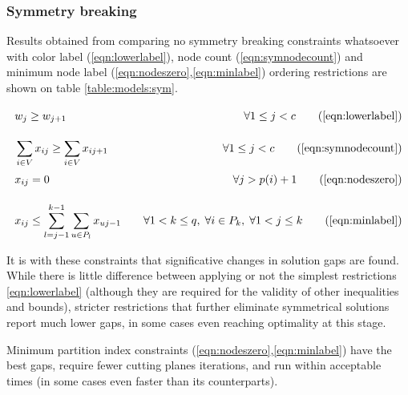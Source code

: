 \subsubsection*{Symmetry breaking}

Results obtained from comparing no symmetry breaking constraints whatsoever with color label (\ref{eqn:lowerlabel}), node count (\ref{eqn:symnodecount}) and minimum node label (\ref{eqn:nodeszero},\ref{eqn:minlabel}) ordering restrictions are shown on table \ref{table:models:sym}.

\begin{align*}
& w_j \geq w_{j+1} \sumheight \quad &\forall 1 \leq j < c \tag{\ref{eqn:lowerlabel}} \\
& \sum_{i \in V} x_{ij} \geq \sum_{i \in V} x_{ij+1} \quad &\forall 1 \leq j < c \tag{\ref{eqn:symnodecount}} \\
& x_{ij} = 0 \sumheight \quad &\forall j > p(i) + 1 \tag{\ref{eqn:nodeszero}} \\
& x_{ij} \leq \sum_{l = j-1}^{k-1} \sum_{u \in P_l} x_{uj-1} \quad &\forall 1 < k \leq q, \; \forall i \in P_k, \; \forall 1 < j \leq k \tag{\ref{eqn:minlabel}}
\end{align*}

It is with these constraints that significative changes in solution gaps are found. While there is little difference between applying or not the simplest restrictions \ref{eqn:lowerlabel} (although they are required for the validity of other inequalities and bounds), stricter restrictions that further eliminate symmetrical solutions report much lower gaps, in some cases even reaching optimality at this stage. 

Minimum partition index constraints (\ref{eqn:nodeszero},\ref{eqn:minlabel}) have the best gaps, require fewer cutting planes iterations, and run within acceptable times (in some cases even faster than its counterparts).


